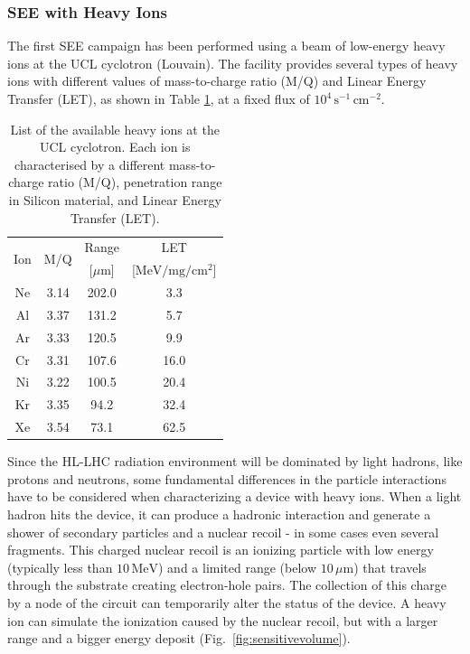 \subsubsection{SEE with Heavy Ions}
\label{subsubsec:SEE with Heavy Ions}

The first SEE campaign has been performed using a beam of low-energy heavy ions at the UCL cyclotron (Louvain).
The facility provides several types of heavy ions with different values of mass-to-charge ratio (M/Q) and Linear Energy Transfer (LET), as shown in Table \ref{tab:SEE_Ions}, at a fixed flux of $10^4\,\textrm{s}^{-1}\,\textrm{cm}^{-2}$.

\begin{table}[]
    \centering
    \begin{tabular}{c | c | c | c}
        \hline
        \hline
        \multirow{2}{*}{Ion} & \multirow{2}{*}{M/Q} & Range & LET \\
        &  & [$\mu$m] & [$\textrm{MeV}/\textrm{mg}/\textrm{cm}^2$] \\
        \hline
        Ne & 3.14 & 202.0 & 3.3 \\
        Al & 3.37 & 131.2 & 5.7 \\
        Ar & 3.33 & 120.5 & 9.9 \\
        Cr & 3.31 & 107.6 & 16.0 \\
        Ni & 3.22 & 100.5 & 20.4 \\
        Kr & 3.35 & 94.2 & 32.4 \\
        Xe & 3.54 & 73.1 & 62.5 \\
        \hline
        \hline
    \end{tabular}
    \caption{List of the available heavy ions at the UCL cyclotron. Each ion is characterised by a different mass-to-charge ratio (M/Q), penetration range in Silicon material, and Linear Energy Transfer (LET).}
    \label{tab:SEE_Ions}
\end{table}

\bigbreak

Since the HL-LHC radiation environment will be dominated by light hadrons, like protons and neutrons, some fundamental differences in the particle interactions have to be considered when characterizing a device with heavy ions.
When a light hadron hits the device, it can produce a hadronic interaction and generate a shower of secondary particles and a nuclear recoil - in some cases even several fragments.
This charged nuclear recoil is an ionizing particle with low energy (typically less than $10\,\textrm{MeV}$) and a limited range (below $10\,\mu\textrm{m}$) that travels through the substrate creating electron-hole pairs. The collection of this charge by a node of the circuit can temporarily alter the status of the device.
A heavy ion can simulate the ionization caused by the nuclear recoil, but with a larger range and a bigger energy deposit (Fig.~\ref{fig:sensitivevolume}).


